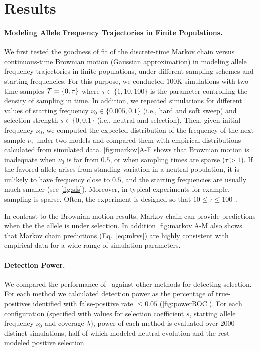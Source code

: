 \section{Results}
\paragraph{Modeling Allele Frequency Trajectories in Finite Populations.} 
We first tested the goodness of fit of the discrete-time Markov chain
versus continuous-time Brownian motion (Gaussian approximation) in modeling 
allele frequency
trajectories in finite populations, under different sampling schemes
and starting frequencies.  For this purpose, we conducted $100$K
simulations with two time samples ${\cal T}=\{0,\tau\}$ where $\tau\in
\{1,10,100\}$ is the parameter controlling the density of sampling
in time.  In addition, we repeated simulations for different values of
starting frequency $\nu_0\in\{0.005,0.1\}$ (i.e., hard and soft sweep)
and selection strength $s\in\{0,0.1\}$ (i.e., neutral and
selection). Then, given initial frequency $\nu_0$, we computed
the expected distribution of the frequency of the next sample $\nu_\tau$
under two models and compared them with empirical distributions
calculated from simulated data.  \ref{fig:markov}A-F shows that
Brownian motion is inadequate when $\nu_0$ is
far from $0.5$, or when sampling times are sparse ($\tau>1$). If the
favored allele arises from standing variation in a neutral population,
it is unlikely to have frequency close to $0.5$, and the starting
frequencies are usually much smaller (see
\ref{fig:sfs}). Moreover, in typical \dmel experiments for
example, sampling is sparse. Often, the experiment is designed so that
$10\le\tau\le100$~\cite{kofler2013guide, orozco2012adaptation,
  zhou2011experimental,franssen2015patterns}.

In contrast to the Brownian motion results,  Markov chain can provide 
predictions when the the allele is under selection. In addition 
\ref{fig:markov}A-M
also shows that Markov chain predictions (Eq.~\ref{eq:mkvs}) are
highly consistent with empirical data for a wide range of simulation
parameters.

\paragraph{Detection Power.} 
We compared the performance of \comale\ against other methods for
detecting selection. For each method we calculated detection power as the 
percentage of true-positives identified with false-positive rate $\le 0.05$
(\ref{fig:powerROC}). For each
configuration (specified with values for selection coefficient $s$,
starting allele frequency $\nu_0$ and coverage $\lambda$), power of each method 
is evaluated over $2000$ distinct simulations, half of which modeled neutral 
evolution
and the rest modeled positive selection.



